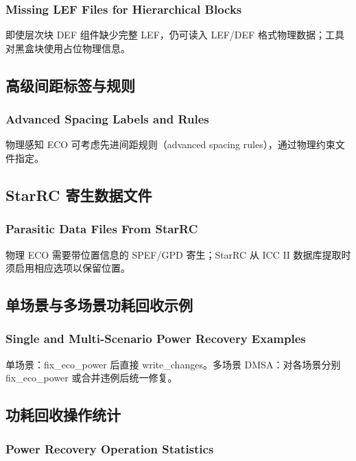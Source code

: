 \subsubsection*{Missing LEF Files for Hierarchical Blocks}

即使层次块 DEF 组件缺少完整 LEF，仍可读入 LEF/DEF 格式物理数据；工具对黑盒块使用占位物理信息。

\subsection{高级间距标签与规则}
\subsubsection*{Advanced Spacing Labels and Rules}

物理感知 ECO 可考虑先进间距规则（advanced spacing rules），通过物理约束文件指定。

\subsection{StarRC 寄生数据文件}
\subsubsection*{Parasitic Data Files From StarRC}

物理 ECO 需要带位置信息的 SPEF/GPD 寄生；StarRC 从 ICC II 数据库提取时须启用相应选项以保留位置。

\subsection{单场景与多场景功耗回收示例}
\subsubsection*{Single and Multi-Scenario Power Recovery Examples}

单场景：fix_eco_power 后直接 write_changes。多场景 DMSA：对各场景分别 fix_eco_power 或合并违例后统一修复。

\subsection{功耗回收操作统计}
\subsubsection*{Power Recovery Operation Statistics}

